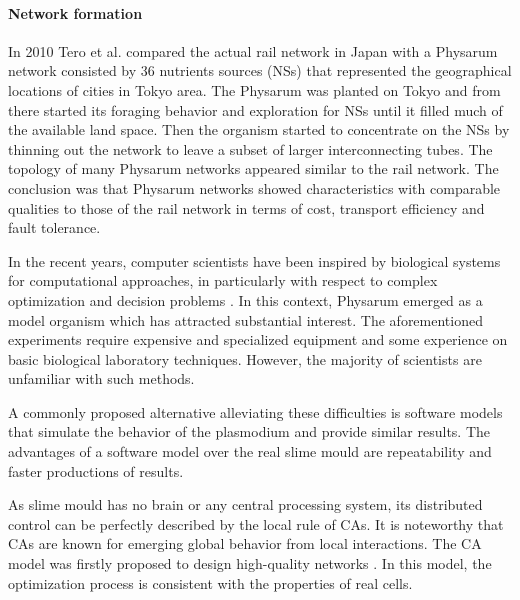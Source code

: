 \paragraph{Network formation}
In 2010 Tero et al. \cite{Tero439} compared the actual rail network in Japan with a Physarum network consisted by 36 nutrients sources (NSs) that represented the geographical locations of cities in Tokyo area. The Physarum was planted on Tokyo and from there started its foraging behavior and exploration for NSs until it filled much of the available land space. Then the organism started to concentrate on the NSs by thinning out the network to leave a subset of larger interconnecting tubes. The topology of many Physarum networks appeared similar to the rail network. The conclusion was that Physarum networks showed characteristics with comparable qualities to those of the rail network in terms of cost, transport efficiency and fault tolerance.\\

\par
In the recent years, computer scientists have been inspired by biological systems for computational approaches, in particularly with respect to complex optimization and decision problems \cite{grube2016physarum}. In this context, Physarum emerged as a model organism which has attracted substantial interest. The aforementioned experiments require expensive and specialized equipment and some experience on basic biological laboratory techniques. However, the majority of scientists are unfamiliar with such methods. 
\par
A commonly proposed alternative alleviating these difficulties is software models that simulate the behavior of the plasmodium and provide similar results. The advantages of a software model over the real slime mould are repeatability and faster productions of results.
\par
As slime mould has no brain or any central processing system, its distributed control can be perfectly described by the local rule of CAs. It is noteworthy that CAs are known for emerging global behavior from local interactions. The CA model was firstly proposed to design high-quality networks \cite{gunji2008minimal}. In this model, the optimization process is consistent with the properties of real cells. 